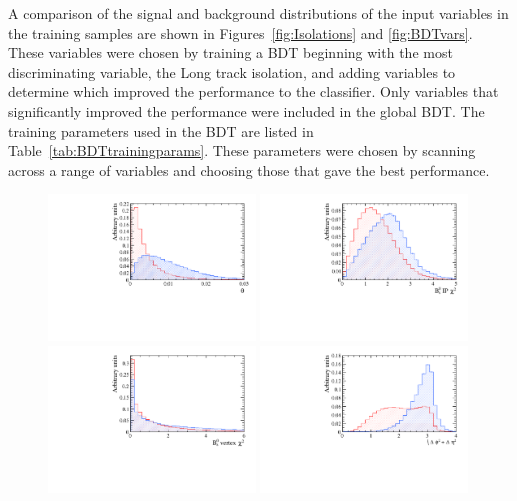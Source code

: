 A comparison of the signal and background distributions of the input variables in the training samples are shown in Figures~\ref{fig:Isolations} and \ref{fig:BDTvars}. These variables were chosen by training a BDT beginning with the most discriminating variable, the Long track isolation, and adding variables to determine which improved the performance to the classifier. Only variables that significantly improved the performance were included in the global BDT. The training parameters used in the BDT are listed in Table~\ref{tab:BDTtrainingparams}. These parameters were chosen by scanning across a range of variables and choosing those that gave the best performance. 

\begin{figure}[htbp]
    \centering
        \includegraphics[width=0.49\textwidth]{./Figs/Selection/Arcos_Mar.pdf}
       \includegraphics[width=0.49\textwidth]{./Figs/Selection/B_IPS_Mar.pdf}
 \includegraphics[width=0.49\textwidth]{./Figs/Selection/Vertex_Mar.pdf}
 \includegraphics[width=0.49\textwidth]{./Figs/Selection/srqt_Mar.pdf}

\end{figure}
